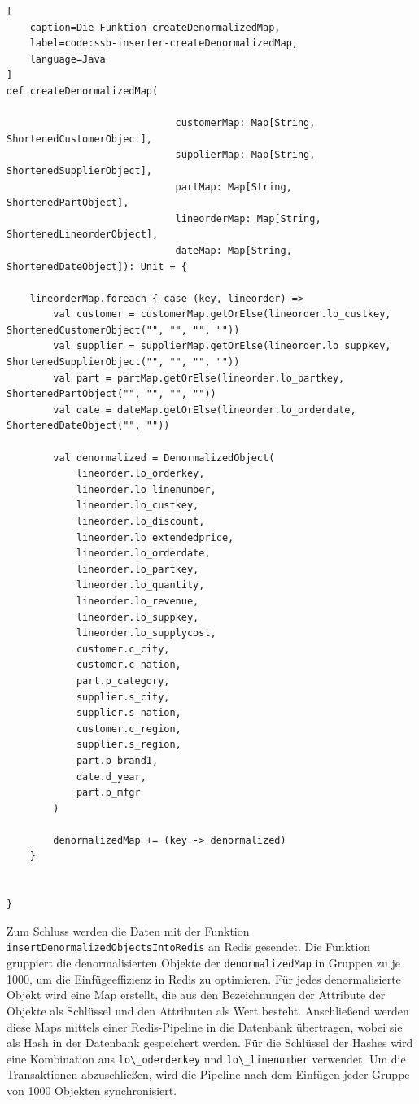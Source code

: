 \begin{lstlisting}[
    caption=Die Funktion createDenormalizedMap,
    label=code:ssb-inserter-createDenormalizedMap,
    language=Java
]
def createDenormalizedMap(

							 customerMap: Map[String, ShortenedCustomerObject],
							 supplierMap: Map[String, ShortenedSupplierObject],
							 partMap: Map[String, ShortenedPartObject],
							 lineorderMap: Map[String, ShortenedLineorderObject],
							 dateMap: Map[String, ShortenedDateObject]): Unit = {

	lineorderMap.foreach { case (key, lineorder) =>
		val customer = customerMap.getOrElse(lineorder.lo_custkey, ShortenedCustomerObject("", "", "", ""))
		val supplier = supplierMap.getOrElse(lineorder.lo_suppkey, ShortenedSupplierObject("", "", "", ""))
		val part = partMap.getOrElse(lineorder.lo_partkey, ShortenedPartObject("", "", "", ""))
		val date = dateMap.getOrElse(lineorder.lo_orderdate, ShortenedDateObject("", ""))

		val denormalized = DenormalizedObject(
			lineorder.lo_orderkey,
			lineorder.lo_linenumber,
			lineorder.lo_custkey,
			lineorder.lo_discount,
			lineorder.lo_extendedprice,
			lineorder.lo_orderdate,
			lineorder.lo_partkey,
			lineorder.lo_quantity,
			lineorder.lo_revenue,
			lineorder.lo_suppkey,
			lineorder.lo_supplycost,
			customer.c_city,
			customer.c_nation,
			part.p_category,
			supplier.s_city,
			supplier.s_nation,
			customer.c_region,
			supplier.s_region,
			part.p_brand1,
			date.d_year,
			part.p_mfgr
		)

		denormalizedMap += (key -> denormalized)
	}


}
\end{lstlisting}


Zum Schluss werden die Daten mit der Funktion \lstinline|insertDenormalizedObjectsIntoRedis| an Redis gesendet.
Die Funktion gruppiert die denormalisierten Objekte der \lstinline|denormalizedMap| in Gruppen zu je 1000, um die Einfügeeffizienz in Redis zu optimieren. Für jedes denormalisierte Objekt wird eine Map erstellt, die aus den Bezeichnungen der Attribute der Objekte als Schlüssel und den Attributen als Wert besteht. Anschließend werden diese Maps mittels einer Redis-Pipeline in die Datenbank übertragen, wobei sie als Hash in der Datenbank gespeichert werden. Für die Schlüssel der Hashes wird eine Kombination aus \lstinline|lo\_oderderkey| und \lstinline|lo\_linenumber| verwendet. Um die Transaktionen abzuschließen, wird die Pipeline nach dem Einfügen jeder Gruppe von 1000 Objekten synchronisiert.


